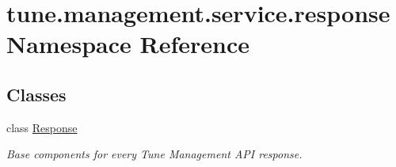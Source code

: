 \hypertarget{namespacetune_1_1management_1_1service_1_1response}{\section{tune.\-management.\-service.\-response Namespace Reference}
\label{namespacetune_1_1management_1_1service_1_1response}
}
\subsection*{Classes}
\begin{DoxyCompactItemize}
\item 
class \hyperlink{classtune_1_1management_1_1service_1_1response_1_1Response}{Response}
\begin{DoxyCompactList}\small\item\em Base components for every Tune Management A\-P\-I response. \end{DoxyCompactList}\end{DoxyCompactItemize}
